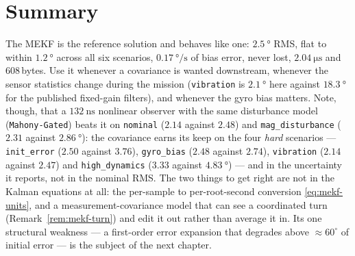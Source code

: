 \section{Summary}
The MEKF is the reference solution and behaves like one: $\SI{2.5}{\degree}$ RMS, flat to within
$\SI{1.2}{\degree}$ across all six scenarios, $\SI{0.17}{\degree\per\second}$ of bias error, never
lost, $\SI{2.04}{\micro\second}$ and 608\,bytes. Use it whenever a covariance is wanted downstream,
whenever the sensor statistics change during the mission (\texttt{vibration} is
$\SI{2.1}{\degree}$ here against $\SI{18.3}{\degree}$ for the published fixed-gain filters), and
whenever the gyro bias matters. Note, though, that a $\SI{132}{\nano\second}$ nonlinear observer
with the same disturbance model (\texttt{Mahony-Gated}) beats it on \texttt{nominal}
($2.14$ against $2.48$) and \texttt{mag\_disturbance} ($2.31$ against $\SI{2.86}{\degree}$): the
covariance earns its keep on the four \emph{hard} scenarios --- \texttt{init\_error}
($2.50$ against $3.76$), \texttt{gyro\_bias} ($2.48$ against $2.74$), \texttt{vibration}
($2.14$ against $2.47$) and \texttt{high\_dynamics} ($3.33$ against $\SI{4.83}{\degree}$) --- and in
the uncertainty it reports, not in the nominal RMS. The two things
to get right are not in the Kalman equations at all: the per-sample to per-root-second conversion
\eqref{eq:mekf-units}, and a measurement-covariance model that can see a coordinated turn
(Remark~\ref{rem:mekf-turn}) and edit it out rather than average it in. Its one structural weakness
--- a first-order error expansion that degrades above $\approx60^\circ$ of initial error --- is the
subject of the next chapter.
